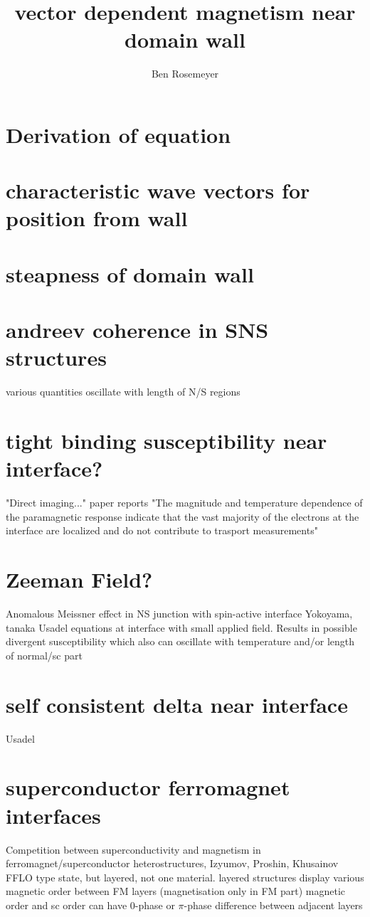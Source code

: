 \documentclass[a4paper,11pt]{article}
\title{vector dependent magnetism near domain wall}
\author{Ben Rosemeyer}
\begin{document}
\maketitle
\tableofcontents

\begin{abstract}
\end{abstract}

\section{Derivation of equation}
\section{characteristic wave vectors for position from wall}
\section{steapness of domain wall}
\section{andreev coherence in SNS structures}
various quantities oscillate with length of N/S regions
\section{tight binding susceptibility near interface?}
"Direct imaging..." paper reports "The magnitude and temperature dependence of the paramagnetic response indicate that the vast majority of the electrons at the interface are localized and do not contribute to trasport measurements"
\section{Zeeman Field?}
Anomalous Meissner effect in NS junction with spin-active interface
Yokoyama, tanaka
Usadel equations at interface with small applied field. Results in possible divergent susceptibility which also can oscillate with temperature and/or length of normal/sc part
\section{self consistent delta near interface}
Usadel
\section{superconductor ferromagnet interfaces}
Competition between superconductivity and magnetism in ferromagnet/superconductor heterostructures, Izyumov, Proshin, Khusainov
FFLO type state, but layered, not one material.
layered structures display various magnetic order between FM layers (magnetisation only in FM part)
magnetic order and sc order can have 0-phase or $\pi$-phase difference between adjacent layers
\end{document}
